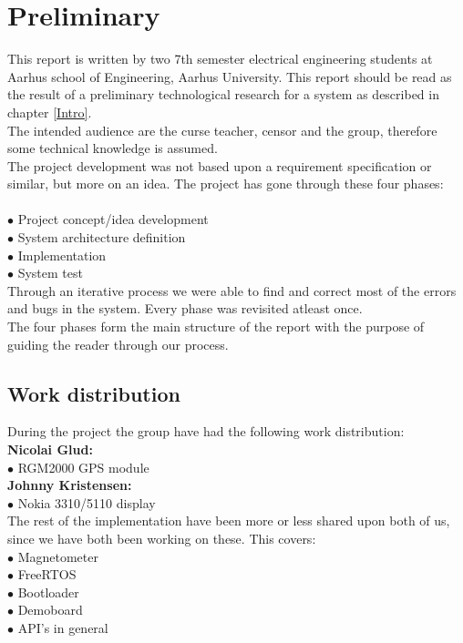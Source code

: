 \chapter{Preliminary}

This report is written by two 7th semester electrical engineering students at Aarhus school of Engineering, Aarhus University. This report should be read as the result of a preliminary technological research for a system as described in chapter \ref{Intro}.\\ 
The intended audience are the curse teacher, censor and the group, therefore some technical knowledge is assumed.\\
The project development was not based upon a requirement specification or similar, but more on an idea. The project has gone through these four phases:\\
\\
$\bullet$ Project concept/idea development\\
$\bullet$ System architecture definition\\
$\bullet$ Implementation\\
$\bullet$ System test\\

Through an iterative process we were able to find and correct most of the errors and bugs in the system. Every phase was revisited atleast once. \\
The four phases form the main structure of the report with the purpose of guiding the reader through our process.

\section{Work distribution}
During the project the group have had the following work distribution:\\
\textbf{Nicolai Glud:}\\
$\bullet$\hspace*{.2cm} RGM2000 GPS module\\
\textbf{Johnny Kristensen:}\\
$\bullet$\hspace*{.2cm} Nokia 3310/5110 display\\
The rest of the implementation have been more or less shared upon both of us, since we have both been working on these. This covers:\\
$\bullet$\hspace*{.2cm} Magnetometer\\
$\bullet$\hspace*{.2cm} FreeRTOS\\
$\bullet$\hspace*{.2cm} Bootloader\\
$\bullet$\hspace*{.2cm} Demoboard\\
$\bullet$\hspace*{.2cm} API's in general